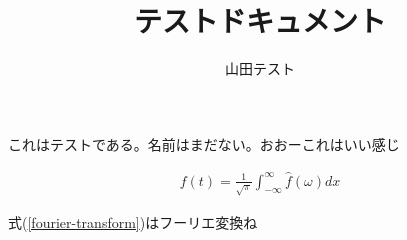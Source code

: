 \documentclass{jsarticle}
\title{テストドキュメント}
\author{山田テスト}
\begin{document}
\maketitle

これはテストである。名前はまだない。おおーこれはいい感じ

\begin{eqnarray}
    \label{fourier-transform}
    f(t)=\frac{1}{\sqrt{\pi}}\int^\infty_{-\infty} \hat{f}(\omega)dx
\end{eqnarray}

式(\ref{fourier-transform})はフーリエ変換ね
\end{document}
